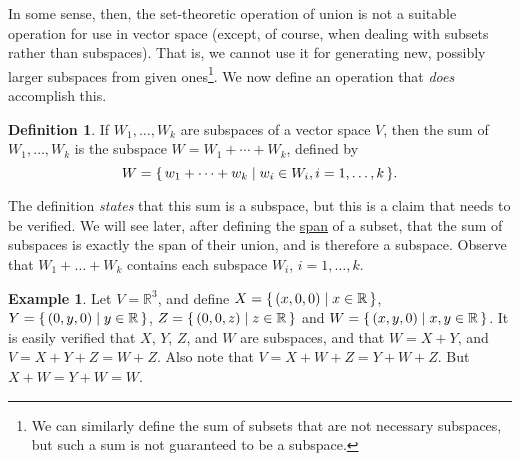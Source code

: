 \documentclass[svgnames]{article}
\theoremstyle{definition}
\newtheorem{Definition}[Theorem]{Definition}
\newtheorem{Example}[Theorem]{Example}
\theoremstyle{remark}
\newcommand{\newterm}[1]{{\color{alertcolor} #1}}
\begin{document}
In some sense, then, the set-theoretic operation of union is not a suitable operation for use in vector space (except, of course, when dealing with subsets rather than subspaces). That is, we cannot use it for generating new, possibly larger subspaces from given ones\footnote{
	We can similarly define the sum of subsets that are not necessary subspaces, but such a sum is not guaranteed to be a subspace.
}. We now define an operation that \emph{does} accomplish this.
\begin{Definition}\label{def:SumSubsp}
If $W_1, \ldots, W_k$ are subspaces of a vector space $V$, then the \newterm{sum} of $W_1, \ldots, W_k$ is the subspace $W = W_1 + \cdots + W_k$, defined by
\begin{equation*}
	W = \qty{\, w_1 + \cdots + w_k \mid w_i \in W_i, i = 1, \ldots, k \,}.
\end{equation*}
\end{Definition}
The definition \emph{states} that this sum is a subspace, but this is a claim that needs to be verified. We will see later, after defining the \hyperref[def:Span]{span} of a subset, that the sum of subspaces is exactly the span of their union, and is therefore a subspace. Observe that $W_1 + \ldots + W_k$ contains each subspace $W_i$, $i = 1, \ldots, k$.
\begin{Example}
Let $V = \mathbb R^3$, and define $X = \qty{\, (x, 0, 0) \mid x \in \mathbb R \,}$, $Y = \qty{\, (0, y, 0) \mid y \in \mathbb R \,}$, $Z = \qty{\, (0, 0, z) \mid z \in \mathbb R \,}$ and $W = \qty{\, (x, y, 0) \mid x, y \in \mathbb R \,}$. It is easily verified that $X$, $Y$, $Z$, and $W$ are subspaces, and that $W = X + Y$, and $V = X + Y + Z = W + Z$. Also note that $V = X + W + Z = Y + W + Z$. But $X + W = Y + W = W$.
\end{Example}

%
\end{document}
